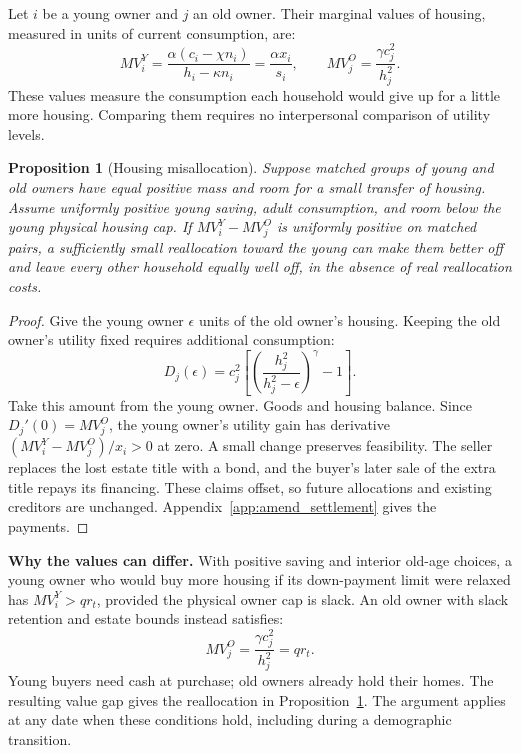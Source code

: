 \documentclass[11pt]{article}
\newtheorem{proposition}{Proposition}
\begin{document}
Let $i$ be a young owner and $j$ an old owner. Their marginal values of
housing, measured in units of current consumption, are:
\begin{equation}
 MV_i^Y=\frac{\alpha(c_i-\chi n_i)}{h_i-\kappa n_i}
       =\frac{\alpha x_i}{s_i},\qquad
 MV_j^O=\frac{\gamma c_j^2}{h_j^2}.
 \label{eq:amend_marginal_values}
\end{equation}
These values measure the consumption each household would give up for a
little more housing. Comparing them requires no interpersonal comparison of
utility levels.

\begin{proposition}[Housing misallocation]
\label{prop:amend_welfare}
Suppose matched groups of young and old owners have equal positive mass
and room for a small transfer of housing. Assume uniformly positive young
saving, adult consumption, and room below the young physical housing cap.
If $MV_i^Y-MV_j^O$ is uniformly positive on matched pairs, a sufficiently small reallocation toward the young can
make them better off and leave every other household equally well off, in
the absence of real reallocation costs.
\end{proposition}

\begin{proof}
Give the young owner $\epsilon$ units of the old owner's housing. Keeping
the old owner's utility fixed requires additional consumption:
\begin{equation}
 D_j(\epsilon)=c_j^2\left[
 \left(\frac{h_j^2}{h_j^2-\epsilon}\right)^\gamma-1\right].
 \label{eq:amend_direct_compensation}
\end{equation}
Take this amount from the young owner. Goods and housing balance. Since
$D_j'(0)=MV_j^O$, the young owner's utility gain has derivative
$(MV_i^Y-MV_j^O)/x_i>0$ at zero. A small change preserves feasibility.
The seller replaces the lost estate title with a bond, and the buyer's
later sale of the extra title repays its financing. These claims offset,
so future allocations and existing creditors are unchanged.
Appendix~\ref{app:amend_settlement} gives the payments.
\end{proof}

\textbf{Why the values can differ.}
With positive saving and interior old-age choices, a young owner who would
buy more housing if its down-payment limit were relaxed has $MV_i^Y>q r_t$,
provided the physical owner cap is slack. An old owner with slack retention and estate
bounds instead satisfies:
\begin{equation}
 MV_j^O=\frac{\gamma c_j^2}{h_j^2}=q r_t.
 \label{eq:amend_oldmrs}
\end{equation}
Young buyers need cash at purchase; old owners already hold their homes.
The resulting value gap gives the reallocation in Proposition~\ref{prop:amend_welfare}.
The argument applies at any date when these conditions hold, including
during a demographic transition.
\end{document}

